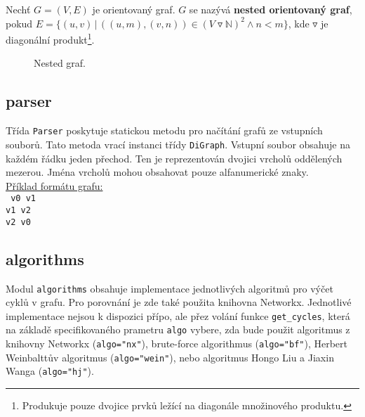             \begin{definition}
                Nechť $G = (V, E)$ je orientovaný graf. $G$ se nazývá \textbf{nested orientovaný graf}, pokud $E = \{(u, v) \,|\, ((u, m), (v, n)) \in (V \triangledown \mathbb{N})^2 \land n < m\}$, kde $\triangledown$ je diagonální produkt\footnote{Produkuje pouze dvojice prvků ležící na diagonále množinového produktu.}.
            \end{definition}

            \begin{figure}[!h]
                \centering
                \caption{Nested graf.}
            \end{figure}

        \subsection{parser}
            Třída \texttt{Parser} poskytuje statickou metodu pro načítání grafů ze vstupních souborů. Tato metoda vrací instanci třídy \texttt{DiGraph}. Vstupní soubor obsahuje na každém řádku jeden přechod. Ten je reprezentován dvojici vrcholů oddělených mezerou. Jména vrcholů mohou obsahovat pouze alfanumerické znaky.\\

            \noindent \underline{Příklad formátu grafu:}
            \vspace*{0.5em}\\
            \noindent\texttt{
                v0 v1\\
                v1 v2\\
                v2 v0\\
            }

        \subsection{algorithms}
            Modul \texttt{algorithms} obsahuje implementace jednotlivých algoritmů pro výčet cyklů v grafu. Pro porovnání je zde také použita knihovna Networkx. Jednotlivé implementace nejsou k dispozici přípo, ale přez volání funkce \texttt{get\_cycles}, která na základě specifikovaného prametru \texttt{algo} vybere, zda bude použit algoritmus z knihovny Networkx (\texttt{algo="nx"}), brute-force algorithmus (\texttt{algo="bf"}), Herbert Weinbalttův algoritmus (\texttt{algo="wein"}), nebo algoritmus Hongo Liu a Jiaxin Wanga (\texttt{algo="hj"}).

